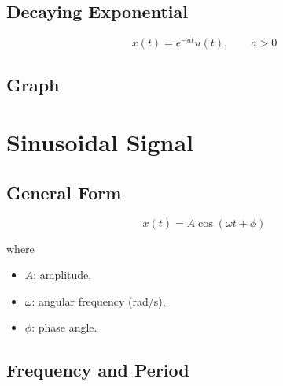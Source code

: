 
\subsection{Decaying Exponential}

\[
x(t)=e^{-at}u(t),\qquad a>0
\]


\subsection{Graph}

\begin{center}
\end{center}


\section{Sinusoidal Signal}


\subsection{General Form}

\[
\boxed{
x(t)=A\cos(\omega t+\phi)
}
\]

where

\begin{itemize}
\item \(A\): amplitude,
\item \(\omega\): angular frequency (rad/s),
\item \(\phi\): phase angle.
\end{itemize}


\subsection{Frequency and Period}

